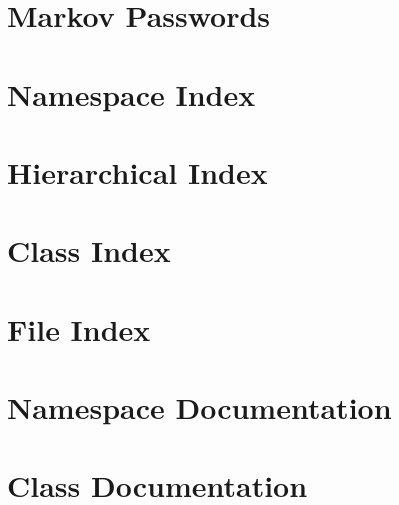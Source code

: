\let\mypdfximage\pdfximage\def\pdfximage{\immediate\mypdfximage}\documentclass[twoside]{book}
\newcommand{\+}{\discretionary{\mbox{\scriptsize$\hookleftarrow$}}{}{}}
\begin{document}
\chapter{Markov Passwords}
\label{index}\hypertarget{index}{}
\chapter{Namespace Index}

\chapter{Hierarchical Index}

\chapter{Class Index}

\chapter{File Index}

\chapter{Namespace Documentation}

















\chapter{Class Documentation}

















\end{document}
